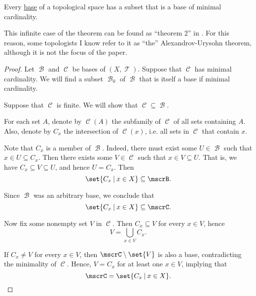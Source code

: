 \begin{proposition}\label{thm:base_has_subset_of_minimal_weight}
  Every \hyperref[def:topological_base]{base} of a topological space has a subset that is a base of minimal cardinality.
\end{proposition}
\begin{comments}
  \item This infinite case of the theorem can be found as \enquote{theorem 2} in \cite{АлександровУрысон1950}. For this reason, some topologists I know refer to it as \enquote{the} Alexandrov-Urysohn theorem, although it is not the focus of the paper.
\end{comments}
\begin{proof}
  Let \( \mscrB \) and \( \mscrC \) be bases of \( (X, \mscrT) \). Suppose that \( \mscrC \) has minimal cardinality. We will find a subset \( \mscrB_0 \) of \( \mscrB \) that is itself a base if minimal cardinality.

   Suppose that \( \mscrC \) is finite. We will show that \( \mscrC \subseteq \mscrB \).

  For each set \( A \), denote by \( \mscrC(A) \) the subfamily of \( \mscrC \) of all sets containing \( A \). Also, denote by \( C_x \) the intersection of \( \mscrC(x) \), i.e. all sets in \( \mscrC \) that contain \( x \).

  Note that \( C_x \) is a member of \( \mscrB \). Indeed, there must exist some \( U \in \mscrB \) such that \( x \in U \subseteq C_x \). Then there exists some \( V \in \mscrC \) such that \( x \in V \subseteq U \). That is, we have \( C_x \subseteq V \subseteq U \), and hence \( U = C_x \). Then
  \begin{equation*}
    \set{ C_x \given x \in X } \subseteq \mscrB.
  \end{equation*}

  Since \( \mscrB \) was an arbitrary base, we conclude that
  \begin{equation*}
    \set{ C_x \given x \in X } \subseteq \mscrC.
  \end{equation*}

  Now fix some nonempty set \( V \) in \( \mscrC \). Then \( C_x \subseteq V \) for every \( x \in V \), hence
  \begin{equation*}
    V = \bigcup_{x \in V} C_x.
  \end{equation*}

  If \( C_x \neq V \) for every \( x \in V \), then \( \mscrC \setminus \set{ V } \) is also a base, contradicting the minimality of \( \mscrC \). Hence, \( V = C_x \) for at least one \( x \in V \), implying that
  \begin{equation*}
    \mscrC = \set{ C_x \given x \in X }.
  \end{equation*}


\end{proof}
